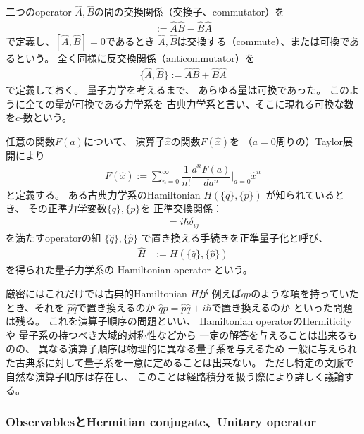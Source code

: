 二つのoperator $\hat{A}, \hat{B}$の間の交換関係（交換子、commutator）を
\begin{align}
    [\hat{A}, \hat{B}] := \hat{A} \hat{B} - \hat{B} \hat{A}
\label{commutator definition}
\end{align}
で定義し、$[\hat{A}, \hat{B}] = 0$であるとき
$\hat{A}, \hat{B}$は交換する（commute）、または可換であるという。
全く同様に反交換関係（anticommutator）を
\begin{align}
    \{\hat{A}, \hat{B}\} := \hat{A} \hat{B} + \hat{B} \hat{A}
\label{anticommutator definition}
\end{align}
で定義しておく。
量子力学を考えるまで、
あらゆる量は可換であった。
このように全ての量が可換である力学系を
古典力学系と言い、そこに現れる可換な数を$c$-数という。

任意の関数$F(a)$について、
演算子$\hat{x}$の関数$F(\hat{x})$を
（$a=0$周りの）Taylor展開により
\begin{align}
    F(\hat{x}) := \sum_{n=0}^\infty
        \dfrac{1}{n!}
        \dfrac{d^nF(a)}{da^n}\bigg|_{a=0}
        \hat{x}^n
\label{function of operator}
\end{align}
と定義する。
ある古典力学系のHamiltonian $H(\{q\},\{p\})$
が知られているとき、
その正準力学変数$\{q\},\{p\}$を
正準交換関係：
\begin{align}
    [ \hat{q}_i , \hat{p}_j ] = i\hbar \delta_{ij}
\end{align}
を満たすoperatorの組
$ \{\hat{q}\} , \{\hat{p}\} $
で置き換える手続きを正準量子化と呼び、
\begin{align}
    \hat{H}
    &:=
    H(\{\hat{q}\} , \{\hat{p}\})
\end{align}
を得られた量子力学系の
Hamiltonian operator
という。

厳密にはこれだけでは古典的Hamiltonian $H$が
例えば$qp$のような項を持っていたとき、それを
$\hat{p}\hat{q}$で置き換えるのか
$\hat{q}\hat{p} = \hat{p}\hat{q} + i\hbar$で置き換えるのか
といった問題は残る。
これを演算子順序の問題といい、
Hamiltonian operatorのHermiticityや
量子系の持つべき大域的対称性などから
一定の解答を与えることは出来るものの、
異なる演算子順序は物理的に異なる量子系を与えるため
一般に与えられた古典系に対して量子系を一意に定めることは出来ない。
ただし特定の文脈で自然な演算子順序は存在し、
このことは経路積分を扱う際により詳しく議論する。

\subsubsection{ObservablesとHermitian conjugate、Unitary operator}

